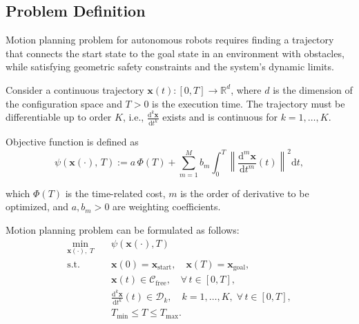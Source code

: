 \subsection{Problem Definition}
\label{sec:motion_planning_model}


Motion planning problem for autonomous robots requires finding a trajectory that connects the start state to the goal state in an environment with obstacles, while satisfying geometric safety constraints and the system's dynamic limits.


Consider a continuous trajectory $\mathbf{x}(t) \colon [0, T] \to \mathbb{R}^d$, where
$d$ is the dimension of the configuration space and $T > 0$ is the execution time.
The trajectory must be differentiable up to order $K$, i.e.,
$\frac{\mathrm{d}^k \mathbf{x}}{\mathrm{d}t^k}$ exists and is continuous for $k = 1, \ldots, K$.

Objective function is defined as
\begin{equation}
    \psi(\mathbf{x}(\cdot),\, T)
    :=
    a\,\Phi(T)
    + \sum_{m=1}^{M} b_m
      \int_0^T
      \left\| \frac{\mathrm{d}^m \mathbf{x}}{\mathrm{d}t^m}(t) \right\|^2
      \mathrm{d}t,
    \label{eq:cost_general}
\end{equation}

which $\Phi(T)$ is the time-related cost, $m$ is the order of derivative to be optimized, and $a, b_m > 0$ are weighting coefficients.

Motion planning problem can be formulated as follows:
\begin{equation}
\begin{aligned}
    \min_{\mathbf{x}(\cdot),\; T} \quad
    & \psi(\mathbf{x}(\cdot), T) \\
    \mathrm{s.t.} \quad
    & \mathbf{x}(0) = \mathbf{x}_{\mathrm{start}},
      \quad
      \mathbf{x}(T) = \mathbf{x}_{\mathrm{goal}}, \\
    & \mathbf{x}(t) \in \mathcal{C}_{\mathrm{free}},
      \quad \forall\, t \in [0, T], \\
    & \frac{\mathrm{d}^k \mathbf{x}}{\mathrm{d}t^k}(t) \in \mathcal{D}_k,
      \quad k = 1, \ldots, K,\; \forall\, t \in [0, T], \\
    & T_{\min} \leq T \leq T_{\max}.
\end{aligned}
\label{eq:planning_problem}
\end{equation}

